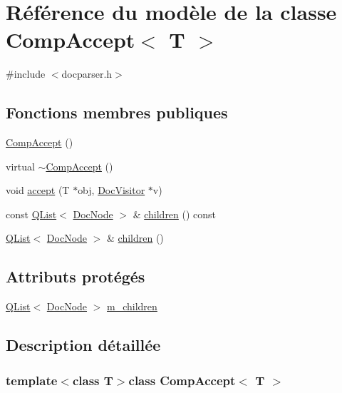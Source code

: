 \hypertarget{class_comp_accept}{}\section{Référence du modèle de la classe Comp\+Accept$<$ T $>$}
\label{class_comp_accept}


{\ttfamily \#include $<$docparser.\+h$>$}

\subsection*{Fonctions membres publiques}
\begin{DoxyCompactItemize}
\item 
\hyperlink{class_comp_accept_ad243d87336e0fd5dae91ca8481a1c85a}{Comp\+Accept} ()
\item 
virtual \hyperlink{class_comp_accept_a0efdf3a4631f1d7894bf5c4ba6025d1e}{$\sim$\+Comp\+Accept} ()
\item 
void \hyperlink{class_comp_accept_a5787ab796a9008bab225031921773b5c}{accept} (T $\ast$obj, \hyperlink{class_doc_visitor}{Doc\+Visitor} $\ast$v)
\item 
const \hyperlink{class_q_list}{Q\+List}$<$ \hyperlink{class_doc_node}{Doc\+Node} $>$ \& \hyperlink{class_comp_accept_ad45c9ef74bc602bead18c2f36ad5d351}{children} () const 
\item 
\hyperlink{class_q_list}{Q\+List}$<$ \hyperlink{class_doc_node}{Doc\+Node} $>$ \& \hyperlink{class_comp_accept_af0bab1c89fc80848fe8be7b5c81afacb}{children} ()
\end{DoxyCompactItemize}
\subsection*{Attributs protégés}
\begin{DoxyCompactItemize}
\item 
\hyperlink{class_q_list}{Q\+List}$<$ \hyperlink{class_doc_node}{Doc\+Node} $>$ \hyperlink{class_comp_accept_af32d89695dc65d34b642dceb0da9e281}{m\+\_\+children}
\end{DoxyCompactItemize}


\subsection{Description détaillée}
\subsubsection*{template$<$class T$>$class Comp\+Accept$<$ T $>$}

